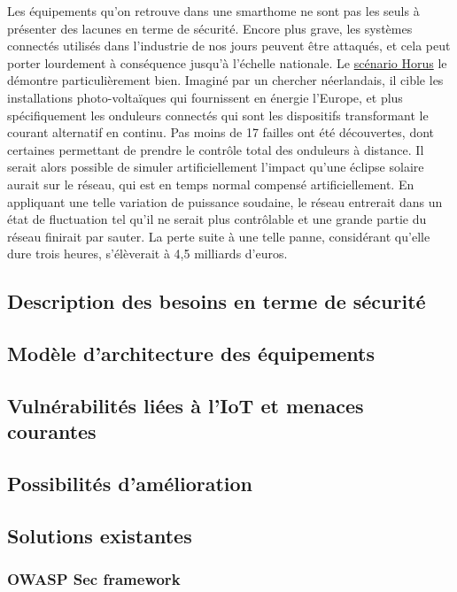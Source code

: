 \documentclass[]{article}
\begin{document}
\par Les équipements qu'on retrouve dans une smarthome ne sont pas les seuls à présenter des lacunes en terme de sécurité. Encore plus grave, les systèmes connectés utilisés dans l'industrie de nos jours peuvent être attaqués, et cela peut porter lourdement à conséquence jusqu'à l'échelle nationale. Le \href{https://horusscenario.com/}{scénario Horus} le démontre particulièrement bien. Imaginé par un chercher néerlandais, il cible les installations photo-voltaïques qui fournissent en énergie l'Europe, et plus spécifiquement les onduleurs connectés qui sont les dispositifs transformant le courant alternatif en continu. Pas moins de 17 failles ont été découvertes, dont certaines permettant de prendre le contrôle total des onduleurs à distance. Il serait alors possible de simuler artificiellement l'impact qu'une éclipse solaire aurait sur le réseau, qui est en temps normal compensé artificiellement. En appliquant une telle variation de puissance soudaine, le réseau entrerait dans un état de fluctuation tel qu'il ne serait plus contrôlable et une grande partie du réseau finirait par sauter. La perte suite à une telle panne, considérant qu'elle dure trois heures, s'élèverait à 4,5 milliards d'euros.

\subsection{Description des besoins en terme de sécurité}

\subsection{Modèle d'architecture des équipements}

\subsection{Vulnérabilités liées à l'IoT et menaces courantes}

\subsection{Possibilités d'amélioration}

\subsection{Solutions existantes}

\subsubsection{OWASP Sec framework}
\end{document}
